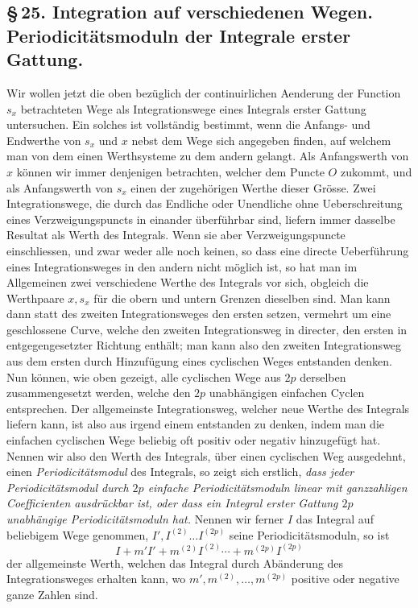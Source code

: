 \documentclass[10pt]{article}
\begin{document}
\subsection*{\S\,25. Integration auf verschiedenen Wegen. Periodicitätsmoduln der Integrale erster Gattung.}

Wir wollen jetzt die oben bezüglich der continuirlichen Aenderung der Function \(s_x\) betrachteten Wege als Integrationswege eines Integrals erster Gattung untersuchen. Ein solches ist vollständig bestimmt, wenn die Anfangs- und Endwerthe von \(s_x\) und \(x\) nebst dem Wege sich angegeben finden, auf welchem man von dem einen Werthsysteme zu dem andern gelangt. Als Anfangswerth von \(x\) können wir immer denjenigen betrachten, welcher dem Puncte \(O\) zukommt, und als Anfangswerth von \(s_x\) einen der zugehörigen Werthe dieser Grösse. Zwei Integrationswege, die durch das Endliche oder Unendliche ohne Ueberschreitung eines Verzweigungspuncts in einander überführbar sind, liefern immer dasselbe Resultat als Werth des Integrals. Wenn sie aber Verzweigungspuncte einschliessen, und zwar weder alle noch keinen, so dass eine directe Ueberführung eines Integrationsweges in den andern nicht möglich ist, so hat man im Allgemeinen zwei verschiedene Werthe des Integrals vor sich, obgleich die Werthpaare \(x,s_x\) für die obern und untern Grenzen dieselben sind. Man kann dann statt des zweiten Integrationsweges den ersten setzen, vermehrt um eine geschlossene Curve, welche den zweiten Integrationsweg in directer, den ersten in entgegengesetzter Richtung enthält; man kann also den zweiten Integrationsweg aus dem ersten durch Hinzufügung eines cyclischen Weges entstanden denken. Nun können, wie oben gezeigt, alle cyclischen Wege aus \(2p\) derselben zusammengesetzt werden, welche den \(2p\) unabhängigen einfachen Cyclen entsprechen. Der allgemeinste Integrationsweg, welcher neue Werthe des Integrals liefern kann, ist also aus irgend einem entstanden zu denken, indem man die einfachen cyclischen Wege beliebig oft positiv oder negativ hinzugefügt hat. Nennen wir also den Werth des Integrals, über einen cyclischen Weg ausgedehnt, einen \emph{Periodicitätsmodul} des Integrals, so zeigt sich erstlich, \emph{dass jeder Periodicitätsmodul durch \(2p\) einfache Periodicitätsmoduln linear mit ganzzahligen Coefficienten ausdrückbar ist, oder dass ein Integral erster Gattung \(2p\) unabhängige Periodicitätsmoduln hat.} Nennen wir ferner \(I\) das Integral auf beliebigem Wege genommen, \(I',I^{(2)}\ldots I^{(2p)}\) seine Periodicitätsmoduln, so ist
\[
I+m'I'+m^{(2)}I^{(2)}\cdots+m^{(2p)}I^{(2p)}
\]
der allgemeinste Werth, welchen das Integral durch Abänderung des Integrationsweges erhalten kann, wo \(m',m^{(2)},\ldots,m^{(2p)}\) positive oder negative ganze Zahlen sind.
\end{document}
